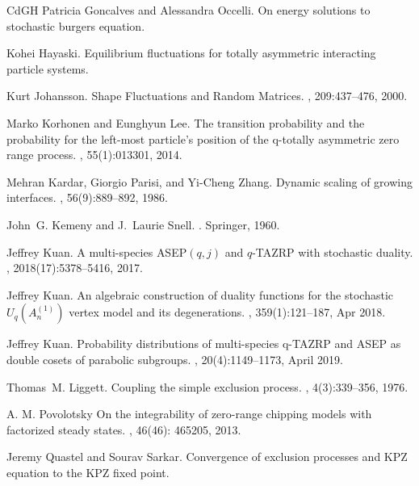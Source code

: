 \begin{thebibliography}{CdGH{\etalchar{+}}}
Patricia Goncalves and Alessandra Occelli.
\newblock On energy solutions to stochastic burgers equation.

Kohei Hayaski.
\newblock Equilibrium fluctuations for totally asymmetric interacting particle
  systems.

Kurt Johansson.
\newblock Shape {F}luctuations and {R}andom {M}atrices.
, 209:437--476, 2000.

Marko Korhonen and Eunghyun Lee.
\newblock The transition probability and the probability for the left-most
  particle's position of the q-totally asymmetric zero range process.
, 55(1):013301, 2014.

Mehran Kardar, Giorgio Parisi, and Yi-Cheng Zhang.
\newblock Dynamic scaling of growing interfaces.
, 56(9):889--892, 1986.

John~G. Kemeny and J.~Laurie Snell.
.
\newblock Springer, 1960.

Jeffrey Kuan.
\newblock A multi-species {ASEP}$(q,j)$ and $q$-{TAZRP} with stochastic
  duality.
,
  2018(17):5378--5416, 2017.

Jeffrey Kuan.
\newblock An algebraic construction of duality functions for the stochastic
  ${U}_q({A}_n^{(1)})$ vertex model and its degenerations.
, 359(1):121--187, Apr
  2018.

Jeffrey Kuan.
\newblock Probability distributions of multi-species q-{TAZRP} and {ASEP} as
  double cosets of parabolic subgroups.
, 20(4):1149--1173, April 2019.

Thomas~M. Liggett.
\newblock Coupling the simple exclusion process.
, 4(3):339--356, 1976.

A. M. Povolotsky
\newblock On the integrability of zero-range chipping models with factorized steady states.
, 46(46): 465205, 2013. 

Jeremy Quastel and Sourav Sarkar.
\newblock Convergence of exclusion processes and KPZ equation to the KPZ fixed
  point.


\end{thebibliography}
